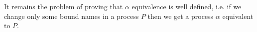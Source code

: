 

It remains the problem of proving that $\alpha$ equivalence is well defined, i.e. if we change only some bound names in a process $P$ then we get a process $\alpha$ equivalent to $P$. 

